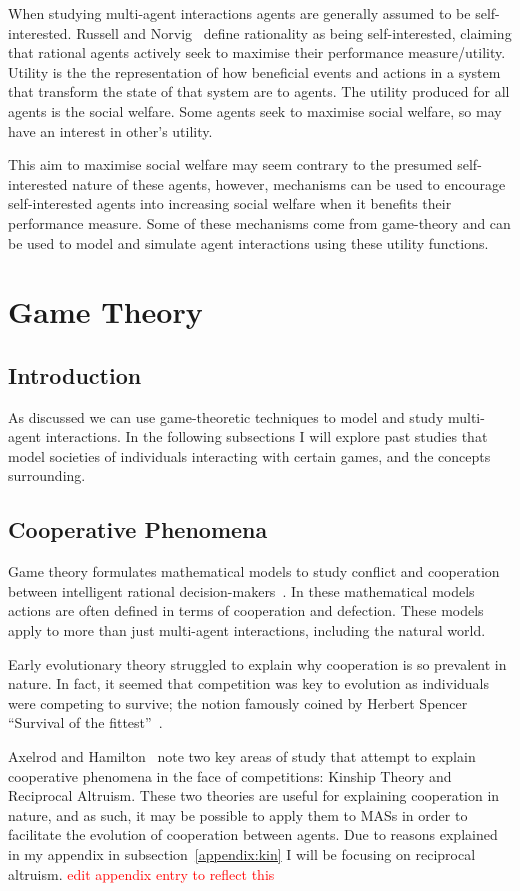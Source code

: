 \documentclass[]{final_report}
\begin{document}
When studying multi-agent interactions agents are generally assumed to be self-interested. Russell and Norvig~\cite{russell2016artificial} define rationality as being self-interested, claiming that rational agents actively seek to maximise their performance measure/utility. Utility is the the representation of how beneficial events and actions in a system that transform the state of that system are to agents. The utility produced for all agents is the social welfare. Some agents seek to maximise social welfare, so may have an interest in other's utility.\par
This aim to maximise social welfare may seem contrary to the presumed self-interested nature of these agents, however, mechanisms can be used to encourage self-interested agents into increasing social welfare when it benefits their performance measure. Some of these mechanisms come from game-theory and can be used to model and simulate agent interactions using these utility functions. 

\section{Game Theory}
\label{sec:backgroundgametheory}

\subsection{Introduction}
As discussed we can use game-theoretic techniques to model and study multi-agent interactions. In the following subsections I will explore past studies that model societies of individuals interacting with certain games, and the concepts surrounding.

\subsection{Cooperative Phenomena}
Game theory formulates mathematical models to study conflict and cooperation between intelligent rational decision-makers~\cite{myerson2013game}. In these mathematical models actions are often defined in terms of cooperation and defection. These models apply to more than just multi-agent interactions, including the natural world.\par 
Early evolutionary theory struggled to explain why cooperation is so prevalent in nature. In fact, it seemed that competition was key to evolution as individuals were competing to survive; the notion famously coined by Herbert Spencer ``Survival of the fittest''~\cite{spencer1864principles}.\par
Axelrod and Hamilton~\cite{evolution_of_cooperation} note two key areas of study that attempt to explain cooperative phenomena in the face of competitions: Kinship Theory and Reciprocal Altruism. These two theories are useful for explaining cooperation in nature, and as such, it may be possible to apply them to MASs in order to facilitate the evolution of cooperation between agents. Due to reasons explained in my appendix in subsection~\ref{appendix:kin} I will be focusing on reciprocal altruism.
\textcolor{red}{edit appendix entry to reflect this}
\end{document}

